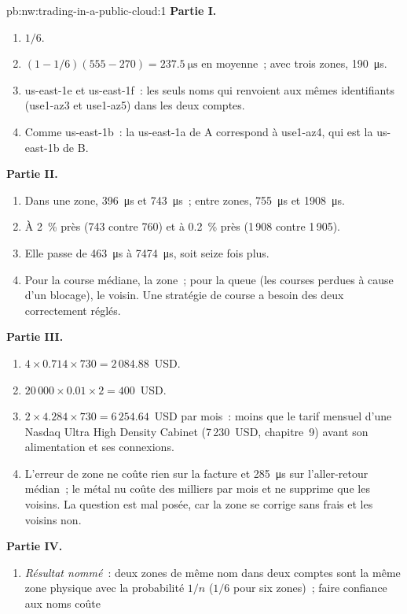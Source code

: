 \begin{solution}{pb:nw:trading-in-a-public-cloud:1}
\textbf{Partie I.}
\begin{enumerate}
\item $1/6$.
\item $(1 - 1/6)(555 - 270) = \qty{237.5}{\micro\second}$ en moyenne~; avec trois zones, \qty{190}{\micro\second}.
\item us-east-1e et us-east-1f~: les seuls noms qui renvoient aux mêmes identifiants (use1-az3 et use1-az5) dans les deux comptes.
\item Comme us-east-1b~: la us-east-1a de A correspond à use1-az4, qui est la us-east-1b de B.
\end{enumerate}
\textbf{Partie II.}
\begin{enumerate}[resume]
\item Dans une zone, \qty{396}{\micro\second} et \qty{743}{\micro\second}~; entre zones, \qty{755}{\micro\second} et \qty{1908}{\micro\second}.
\item À 2~\% près (743 contre 760) et à 0.2~\% près (1\,908 contre 1\,905).
\item Elle passe de \qty{463}{\micro\second} à \qty{7474}{\micro\second}, soit seize fois plus.
\item Pour la course médiane, la zone~; pour la queue (les courses perdues à cause d'un blocage), le voisin. Une stratégie de course a besoin des deux correctement réglés.
\end{enumerate}
\textbf{Partie III.}
\begin{enumerate}[resume]
\item $4 \times 0.714 \times 730 = 2\,084.88$~USD.
\item $20\,000 \times 0.01 \times 2 = 400$~USD.
\item $2 \times 4.284 \times 730 = 6\,254.64$~USD par mois~: moins que le tarif mensuel d'une Nasdaq Ultra High Density Cabinet (7\,230~USD, chapitre~9) avant
  son alimentation et ses connexions.
\item L'erreur de zone ne coûte rien sur la facture et \qty{285}{\micro\second} sur l'aller-retour médian~; le métal nu coûte des milliers par mois et ne supprime
  que les voisins. La question est mal posée, car la zone se corrige sans frais et les voisins non.
\end{enumerate}
\textbf{Partie IV.}
\begin{enumerate}[resume]
\item \emph{Résultat nommé}~: deux zones de même nom dans deux comptes sont la même zone physique avec la probabilité $1/n$ ($1/6$ pour six zones)~; faire confiance aux noms coûte

\end{enumerate}
\end{solution}
